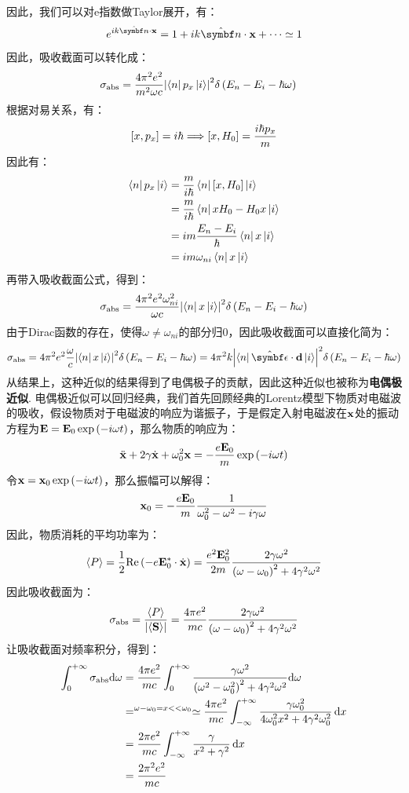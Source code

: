 因此，我们可以对e指数做Taylor展开，有：
\[
e^{ik\uv{n}\cdot\vr} = 1 + ik\uv{n}\cdot\vr + \cdots \simeq 1 
\]
因此，吸收截面可以转化成：
\begin{align*}
& \sigma_{\mathrm{abs}} = \frac{4\pi^{2}e^{2}}{m^{2}\omega c}\abs{\bra{n}p_{x}\ket{i}}^{2}\delta\left({E_{n}-E_{i}-\hbar\omega}\right)
\end{align*}
根据对易关系，有：
\[
[x,p_{x}] = i\hbar \Longrightarrow [x,H_{0}] = \frac{i\hbar p_{x}}{m}
\]
因此有：
\begin{align*}
\bra{n}p_{x}\ket{i} 
& = \frac{m}{i\hbar}\bra{n}[x,H_{0}]\ket{i} \\
& = \frac{m}{i\hbar}\bra{n}xH_{0} - H_{0}x\ket{i} \\
& = im\frac{E_{n}-E_{i}}{\hbar}\bra{n}x\ket{i} \\
& = im\omega_{ni}\bra{n}x\ket{i}
\end{align*}
再带入吸收截面公式，得到：
\[
\sigma_{\mathrm{abs}} = \frac{4\pi^{2}e^{2}\omega_{ni}^{2}}{\omega c}\abs{\bra{n}x\ket{i}}^{2}\delta\left({E_{n}-E_{i}-\hbar\omega}\right)
\]
由于Dirac函数的存在，使得\(\omega\neq\omega_{ni}\)的部分归0，因此吸收截面可以直接化简为：
\[
\sigma_{\mathrm{abs}} = 4\pi^{2}e^{2}\frac{\omega}{c}\abs{\bra{n}x\ket{i}}^{2}\delta\br{E_{n}-E_{i}-\hh\omega} = 4\pi^{2}k\abs{\bra{n}\uv{\epsilon}\cdot\mathbf{d}\ket{i}}^{2}\delta\br{E_{n}-E_{i}-\hh\omega}
\]
从结果上，这种近似的结果得到了电偶极子的贡献，因此这种近似也被称为\textbf{电偶极近似}. 电偶极近似可以回归经典，我们首先回顾经典的Lorentz模型下物质对电磁波的吸收，假设物质对于电磁波的响应为谐振子，于是假定入射电磁波在\(\mathbf{x}\)处的振动方程为\(\mathbf{E} = \mathbf{E}_{0}\exp\left({-i\omega t}\right)\)，那么物质的响应为：
\[
\ddot{\mathbf{x}} + 2\gamma\dot{\mathbf{x}} + \omega_{0}^{2}\mathbf{x} = -\frac{e\mathbf{E}_{0}}{m}\exp\left({-i\omega t}\right) 
\]
令\(\mathbf{x}=\mathbf{x}_{0}\exp\left({-i\omega t}\right)\)，那么振幅可以解得：
\[
\mathbf{x}_{0} = -\frac{e\mathbf{E}_{0}}{m}\frac{1}{\omega_{0}^{2} - \omega^{2} - i\gamma\omega}
\]
因此，物质消耗的平均功率为：
\[
\left\langle{P}\right\rangle = \frac{1}{2}\mathrm{Re}\left({-e\mathbf{E}_{0}^{*}\cdot\dot{\mathbf{x}}}\right) = \frac{e^{2}\mathbf{E}_{0}^{2}}{2m}\frac{2\gamma\omega^{2}}{\left({\omega-\omega_{0}}\right)^{2}+4\gamma^{2}\omega^{2}}
\]
因此吸收截面为：
\[
\sigma_{\mathrm{abs}} = \frac{\left\langle{P}\right\rangle}{\abs{\left\langle{\mathbf{S}}\right\rangle}} = \frac{4\pi e^{2}}{mc}\frac{2\gamma\omega^{2}}{\left({\omega-\omega_{0}}\right)^{2} + 4\gamma^{2}\omega^{2}}
\]
让吸收截面对频率积分，得到：
\begin{align*}
\int_{0}^{+\infty}\sigma_{\mathrm{abs}}\dd\omega 
& = \frac{4\pi e^{2}}{mc}\int_{0}^{+\infty}\frac{\gamma\omega^{2}}{\left({\omega^{2}-\omega_{0}^{2}}\right)^{2}+4\gamma^{2}\omega^{2}}\dd\omega \\
& =^{\omega-\omega_{0}=x<<\omega_{0}}\simeq \frac{4\pi e^{2}}{mc}\int_{-\infty}^{+\infty} \frac{\gamma\omega^{2}_{0}}{4\omega_{0}^{2}x^{2} + 4\gamma^{2}\omega_{0}^{2}}\dd{x} \\
& = \frac{2\pi e^{2}}{mc}\int_{-\infty}^{+\infty}\frac{\gamma}{x^{2}+\gamma^{2}}\dd{x} \\
& = \frac{2\pi^{2}e^{2}}{mc}
\end{align*}
